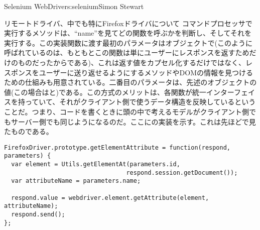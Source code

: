\begin{aosachapter}{Selenium WebDriver}{s:selenium}{Simon Stewart}
\begin{aosasect1}{リモートドライバ、中でも特にFirefoxドライバについて}
コマンドプロセッサで実行するメソッドは、``name''を見てどの関数を呼ぶかを判断し、そしてそれを実行する。この実装関数に渡す最初のパラメータはオブジェクトで(このように呼ばれているのは、もともとこの関数は単にユーザーにレスポンスを返すためだけのものだったからである)、これは返す値をカプセル化するだけではなく、レスポンスをユーザーに送り返せるようにするメソッドやDOMの情報を見つけるための仕組みも用意されている。二番目のパラメータは、先述のオブジェクトの値(この場合はと)である。この方式のメリットは、各関数が統一インターフェイスを持っていて、それがクライアント側で使うデータ構造を反映しているということだ。つまり、コードを書くときに頭の中で考えるモデルがクライアント側でもサーバー側でも同じようになるのだ。ここにの実装を示す。これは先ほどで見たものである。

\begin{verbatim}
FirefoxDriver.prototype.getElementAttribute = function(respond, parameters) {
  var element = Utils.getElementAt(parameters.id,
                                  respond.session.getDocument());
  var attributeName = parameters.name;

  respond.value = webdriver.element.getAttribute(element, attributeName);
  respond.send();
};
\end{verbatim}


\end{aosasect1}
\end{aosachapter}
